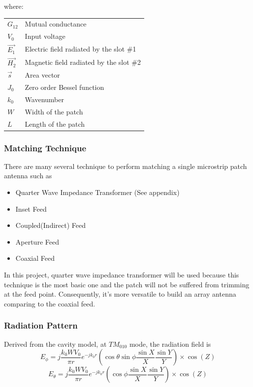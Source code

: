 \documentclass[11pt,a4paper]{article}
\makeatletter
\newenvironment{conditions}[1][where:]
  {#1 \begin{tabular}[t]{>{$}l<{$} @{${}={}$} l}}
  {\end{tabular}}
\makeatother
\begin{document}
\begin{conditions}
 		G_{12}   	&	Mutual conductance \\
        V_0			&	Input voltage \\
        \vec{E_1}   &	Electric field radiated by the slot \#1\\
 		\vec{H_2} 	&	Magnetic field radiated by the slot \#2\\
 		\vec{s}		&	Area vector\\
		J_0			&	Zero order Bessel function \\ 
        k_0			&	Wavenumber \\
 		W			&	Width of the patch\\
        L			&	Length of the patch\\
\end{conditions}

\subsubsection{Matching Technique}
There are many several technique to perform matching a single microstrip patch antenna such as\cite{AtT}
\begin{itemize}
	\item Quarter Wave Impedance Transformer (See appendix)
    \item Inset Feed
    \item Coupled(Indirect) Feed
    \item Aperture Feed
    \item Coaxial Feed
\end{itemize}

In this project, quarter wave impedance transformer will be used because this technique is the most basic one and the patch will not be suffered from trimming at the feed point. Consequently, it's more versatile to build an array antenna comparing to the coaxial feed. 

\subsubsection{Radiation Pattern}
Derived from the cavity model\cite{NkN:16}, at $TM_{010}$ mode, the radiation field is
\begin{equation}
        E_{\phi} = j\frac{k_0WV_0}{\pi r}e^{-jk_0r} \left(\cos\theta \sin\phi \frac{\sin{X}}{X}\frac{\sin{Y}}{Y}\right) \times \cos(Z)
\end{equation}
\begin{equation}
        E_{\theta} = j\frac{k_0WV_0}{\pi r}e^{-jk_0r} \left(\cos\phi \frac{\sin{X}}{X}\frac{\sin{Y}}{Y}\right) \times \cos(Z)
\end{equation}
\end{document}
